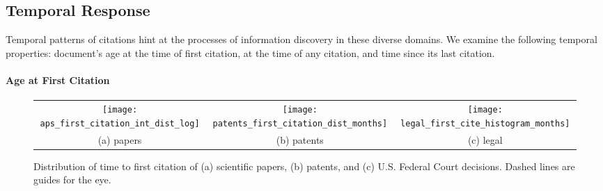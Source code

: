 \documentclass[10pt]{bmc_article}
\newenvironment{bmcformat}{\baselineskip20pt\sloppy\setboolean{publ}{false}}{\baselineskip20pt\sloppy}
\begin{document}
\begin{bmcformat}
\subsection{Temporal Response}
Temporal patterns of citations hint at the processes of information discovery in these diverse domains. We examine the following temporal properties: document's age at the time of first citation, at the time of any citation, and time since its last citation.

\paragraph{Age at First Citation}

\begin{figure*}[htb] %
   \centering
   \begin{tabular}{@{}c@{}c@{}c@{}}
      \texttt{[image: aps\_first\_citation\_int\_dist\_log]} &
   \texttt{[image: patents\_first\_citation\_dist\_months]} &
   \texttt{[image: legal\_first\_cite\_histogram\_months]}
\\
   (a) papers & (b) patents & (c) legal
   \end{tabular}
   \caption{Distribution of time to first citation of (a) scientific papers, (b) patents, and (c) U.S. Federal Court decisions. Dashed lines are guides for the eye.}
   \label{fig:first-cite-dist}
\end{figure*}


\end{bmcformat}
\end{document}
